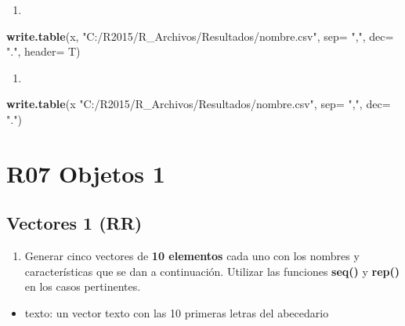 \documentclass[]{book}
\newenvironment{Shaded}{\begin{snugshade}}{\end{snugshade}}
\newcommand{\DataTypeTok}[1]{\textcolor[rgb]{0.13,0.29,0.53}{#1}}
\newcommand{\KeywordTok}[1]{\textcolor[rgb]{0.13,0.29,0.53}{\textbf{#1}}}
\newcommand{\NormalTok}[1]{#1}
\newcommand{\StringTok}[1]{\textcolor[rgb]{0.31,0.60,0.02}{#1}}
\providecommand{\tightlist}{%
  \setlength{\itemsep}{0pt}\setlength{\parskip}{0pt}}
\begin{document}
\begin{enumerate}
\def\labelenumi{\arabic{enumi}.}
\setcounter{enumi}{3}
\item
\end{enumerate}

\begin{Shaded}
\begin{Highlighting}[]
\KeywordTok{write.table}\NormalTok{(x, }\StringTok{"C:/R2015/R_Archivos/Resultados/nombre.csv"}\NormalTok{, }\DataTypeTok{sep=} \StringTok{","}\NormalTok{, }\DataTypeTok{dec=} \StringTok{"."}\NormalTok{, }\DataTypeTok{header=}\NormalTok{ T)}
\end{Highlighting}
\end{Shaded}

\begin{enumerate}
\def\labelenumi{\arabic{enumi}.}
\setcounter{enumi}{4}
\item
\end{enumerate}

\begin{Shaded}
\begin{Highlighting}[]
\KeywordTok{write.table}\NormalTok{(x }\StringTok{"C:/R2015/R_Archivos/Resultados/nombre.csv"}\NormalTok{, }\DataTypeTok{sep=} \StringTok{","}\NormalTok{, }\DataTypeTok{dec=} \StringTok{"."}\NormalTok{)}
\end{Highlighting}
\end{Shaded}

\hypertarget{r07-objetos-1}{%
\chapter*{R07 Objetos 1}\label{r07-objetos-1}}

\hypertarget{vectores-1-rr}{%
\section{Vectores 1 (RR)}\label{vectores-1-rr}}

\begin{enumerate}
\def\labelenumi{\arabic{enumi}.}
\tightlist
\item
  Generar cinco vectores de \textbf{10 elementos} cada uno con los nombres y características que se dan a continuación. Utilizar las funciones \textbf{seq()} y \textbf{rep()} en los casos pertinentes.
\end{enumerate}

\begin{itemize}
\tightlist
\item
  texto: un vector texto con las 10 primeras letras del abecedario
\end{itemize}
\end{document}
